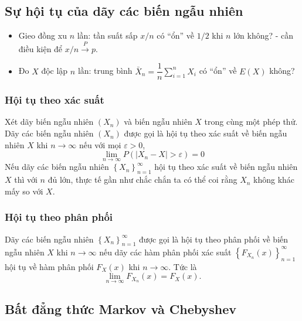 \documentclass[12pt,a4paper]{article}
\begin{document}
\subsection{Sự hội tụ của dãy các biến ngẫu nhiên}

\begin{ynghia}[title={Hai câu hỏi cổ điển}]
\begin{itemize}
  \item Gieo đồng xu $n$ lần: tần suất sấp $x/n$ có ``ổn'' về $1/2$ khi $n$ lớn không? - cần điều kiện để $x/n \xrightarrow{P} p$.
  \item Đo $X$ độc lập $n$ lần: trung bình $\bar{X}_n = \dfrac{1}{n}\sum_{i=1}^n X_i$ có ``ổn'' về $E(X)$ không?
\end{itemize}
\end{ynghia}

\subsubsection{Hội tụ theo xác suất}

\begin{dinhnghia}[title={Hội tụ theo xác suất}]
Xét dãy biến ngẫu nhiên $(X_n)$ và biến ngẫu nhiên $X$ trong cùng một phép thử. Dãy các biến ngẫu nhiên $(X_n)$ được gọi là hội tụ theo xác suất về biến ngẫu nhiên $X$ khi $n \to \infty$ nếu với mọi $\varepsilon > 0$,
\[
  \lim_{n \to \infty} P(|X_n - X| > \varepsilon) = 0
\]
Nếu dãy các biến ngẫu nhiên $\left\{X_n\right\}_{n=1}^{\infty}$ hội tụ theo xác suất về biến ngẫu nhiên $X$ thì với $n$ đủ lớn, thực tế gần như chắc chắn ta có thể coi rằng $X_n$ không khác mấy so với $X$.
\end{dinhnghia}

\subsubsection{Hội tụ theo phân phối}

\begin{dinhnghia}[title={Hội tụ theo phân phối}]
Dãy các biến ngẫu nhiên $\left\{X_n\right\}_{n=1}^{\infty}$ được gọi là hội tụ theo phân phối về biến ngẫu nhiên $X$ khi $n \to \infty$ nếu
dãy các hàm phân phối xác suất $\left\{F_{X_n}(x)\right\}_{n=1}^{\infty}$ hội tụ về hàm phân phối $F_X(x)$ khi $n \to \infty$. Tức là
\[
  \lim_{n \to \infty} F_{X_n}(x) = F_X(x).
\]
\end{dinhnghia}

\subsection{Bất đẳng thức Markov và Chebyshev}
\end{document}
